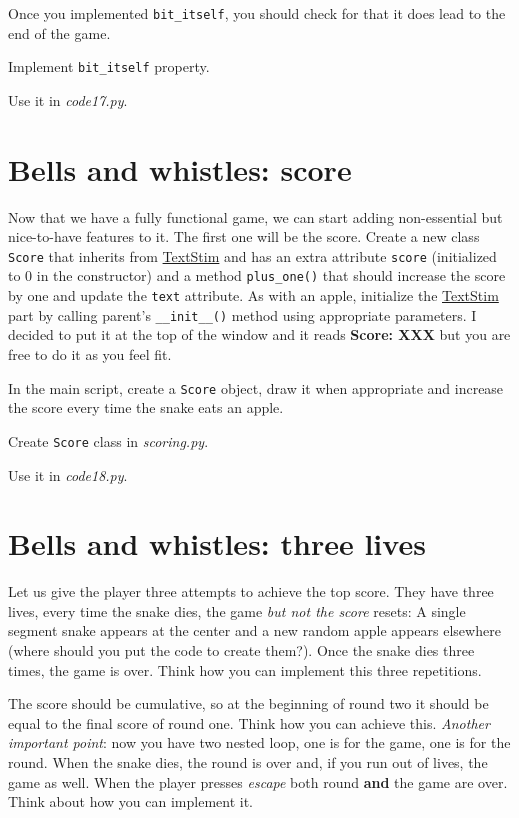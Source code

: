\documentclass[
]{book}
\begin{document}
Once you implemented \texttt{bit\_itself}, you should check for that it does lead to the end of the game.

Implement \texttt{bit\_itself} property.

Use it in \emph{code17.py}.

\hypertarget{bells-and-whistles-score}{%
\section{Bells and whistles: score}\label{bells-and-whistles-score}}

Now that we have a fully functional game, we can start adding non-essential but nice-to-have features to it. The first one will be the score. Create a new class \texttt{Score} that inherits from \href{https://psychopy.org/api/visual/textstim.html\#psychopy.visual.TextStim}{TextStim} and has an extra attribute \texttt{score} (initialized to \(0\) in the constructor) and a method \texttt{plus\_one()} that should increase the score by one and update the \texttt{text} attribute. As with an apple, initialize the \href{https://psychopy.org/api/visual/textstim.html\#psychopy.visual.TextStim}{TextStim} part by calling parent's \texttt{\_\_init\_\_()} method using appropriate parameters. I decided to put it at the top of the window and it reads \textbf{Score: XXX} but you are free to do it as you feel fit.

In the main script, create a \texttt{Score} object, draw it when appropriate and increase the score every time the snake eats an apple.

Create \texttt{Score} class in \emph{scoring.py}.

Use it in \emph{code18.py}.

\hypertarget{bells-and-whistles-three-lives}{%
\section{Bells and whistles: three lives}\label{bells-and-whistles-three-lives}}

Let us give the player three attempts to achieve the top score. They have three lives, every time the snake dies, the game \emph{but not the score} resets: A single segment snake appears at the center and a new random apple appears elsewhere (where should you put the code to create them?). Once the snake dies three times, the game is over. Think how you can implement this three repetitions.

The score should be cumulative, so at the beginning of round two it should be equal to the final score of round one. Think how you can achieve this. \emph{Another important point}: now you have two nested loop, one is for the game, one is for the round. When the snake dies, the round is over and, if you run out of lives, the game as well. When the player presses \emph{escape} both round \textbf{and} the game are over. Think about how you can implement it.
\end{document}
